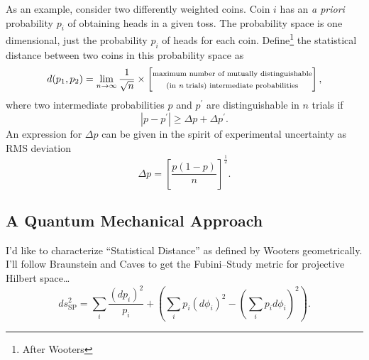 As an example, consider two differently weighted coins.  Coin $i$ has
an {\it a priori} probability $p_i$ of obtaining heads in a given toss.
The probability space is one dimensional, just the probability 
$p_i$ of heads for each coin.
Define\footnote{After Wooters\cite{Wooters:81}} 
the statistical distance between two coins in this probability space as
\begin{equation}
d(p_1,p_2) = \lim_{n\to\infty} \frac{1}{\sqrt{n}}\times
    \left[\begin{matrix}
        \text{\scriptsize maximum number of mutually distinguishable}\\
        \text{\scriptsize (in {\it n} trials) intermediate probabilities}
    \end{matrix}\right],
\label{e:ClassicalDistance}
\end{equation}
where two intermediate probabilities $p$ and $p^\prime$ are distinguishable
in $n$ trials if 
\begin{equation}
\left| p-p^\prime \right| \ge \Delta p + \Delta p^\prime.
\end{equation}
An expression for $\Delta p$ can be given in the spirit of experimental
uncertainty as RMS deviation
\begin{equation}
\Delta p = \left[ \frac{p(1-p)}{n} \right]^\frac{1}{2}.
\end{equation}


\subsection{A Quantum Mechanical Approach}

I'd like to characterize ``Statistical Distance'' as defined by Wooters\cite{Wooters:81}
geometrically.  I'll follow Braunstein and Caves\cite{Braunstein/Caves:94}
to get the Fubini--Study metric for projective Hilbert space\dots
\begin{equation}
                ds_{\text{SP}}^2 = \sum_i \frac{(dp_i)^2}{p_i} + 
                \left( 
                    \sum_i p_i(d\phi_i)^2 - \left( \sum_i p_i d\phi_i \right)^2
                \right).
\end{equation}

